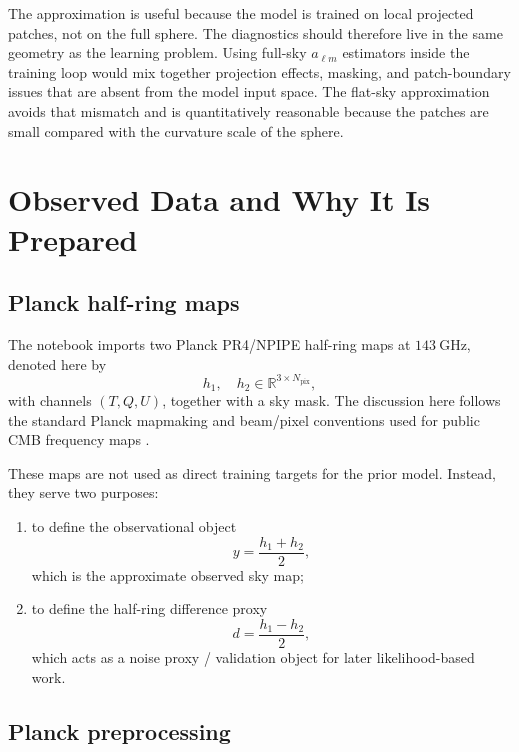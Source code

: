 \documentclass[11pt]{article}
\newcommand{\RR}{\mathbb{R}}
\begin{document}
The approximation is useful because the model is trained on local projected patches, not on the full sphere. The diagnostics should therefore live in the same geometry as the learning problem. Using full-sky \(a_{\ell m}\) estimators inside the training loop would mix together projection effects, masking, and patch-boundary issues that are absent from the model input space. The flat-sky approximation avoids that mismatch and is quantitatively reasonable because the patches are small compared with the curvature scale of the sphere.

\section{Observed Data and Why It Is Prepared}

\subsection{Planck half-ring maps}

The notebook imports two Planck PR4/NPIPE half-ring maps at \(143\ \mathrm{GHz}\), denoted here by
\begin{equation}
  h_1,\quad h_2 \in \RR^{3 \times N_{\mathrm{pix}}},
\end{equation}
with channels \((T,Q,U)\), together with a sky mask. The discussion here follows the standard Planck mapmaking and beam/pixel conventions used for public CMB frequency maps \cite{planck2018overview,gorski2005}.

These maps are not used as direct training targets for the prior model. Instead, they serve two purposes:
\begin{enumerate}[leftmargin=1.5em]
  \item to define the observational object
  \begin{equation}
    y = \frac{h_1 + h_2}{2},
  \end{equation}
  which is the approximate observed sky map;
  \item to define the half-ring difference proxy
  \begin{equation}
    d = \frac{h_1 - h_2}{2},
  \end{equation}
  which acts as a noise proxy / validation object for later likelihood-based work.
\end{enumerate}

\subsection{Planck preprocessing}
\end{document}
